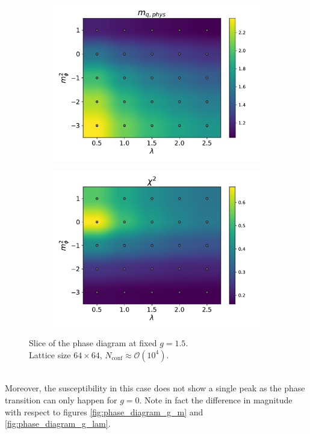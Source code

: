 \begin{figure}[hbp]
\begin{subfigure}[b]{0.48\textwidth}
    \end{subfigure}
    \begin{subfigure}[b]{0.48\textwidth}
        \includegraphics[width=\textwidth]{figures/phase_diagram/m-lam/phase_diagram_mqphys.pdf}
    \end{subfigure}
    \begin{subfigure}[b]{0.48\textwidth}
        \includegraphics[width=\textwidth]{figures/phase_diagram/m-lam/phase_diagram_chi2.pdf}
    \end{subfigure}
    \caption{Slice of the phase diagram at fixed $g = 1.5$. \\ Lattice size $64 \times 64$, $N_\text{conf} \approx \mathcal{O}(10^4)$.}
    \label{fig:phase_diagram_m_lam}
\end{figure}\\
Moreover, the susceptibility in this case does not show a single peak as the phase transition can only happen for $g=0$. Note in fact the difference in magnitude with respect to figures \ref{fig:phase_diagram_g_m} and \ref{fig:phase_diagram_g_lam}.

